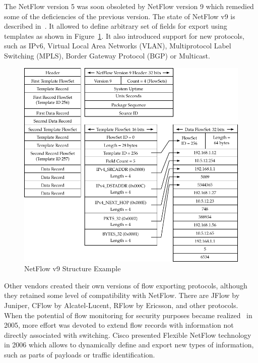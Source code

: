 The NetFlow version 5 was soon obsoleted by NetFlow version 9 which remedied some of the deficiencies of the previous version. The state of NetFlow v9 is described in~\cite{rfc3954}. It allowed to define arbitrary set of fields for export using templates as shown in Figure~\ref{fig:nf9-protocol}. It also introduced support for new protocols, such as IPv6, Virtual Local Area Networks (VLAN), Multiprotocol Label Switching (MPLS), Border Gateway Protocol (BGP) or Multicast. 

\begin{figure}[t!]
  \begin{center}
    \includegraphics[width=\textwidth]{figures/nf9-protocol}
  \end{center}
  \caption{NetFlow v9 Structure Example}
  \label{fig:nf9-protocol}
\end{figure}

Other vendors created their own versions of flow exporting protocols, although they retained some level of compatibility with NetFlow. There are JFlow by Juniper, CFlow by Alcatel-Lucent, RFlow by Ericsson, and other protocols. When the potential of flow monitoring for security purposes became realized~\cite{CiscoSystems-2005-Cisco} in 2005, more effort was devoted to extend flow records with information not directly associated with switching. Cisco presented Flexible NetFlow technology~\cite{CiscoSystems-2008-Cisco} in 2006 which allows to dynamically define and export new types of information, such as parts of payloads or traffic identification.

